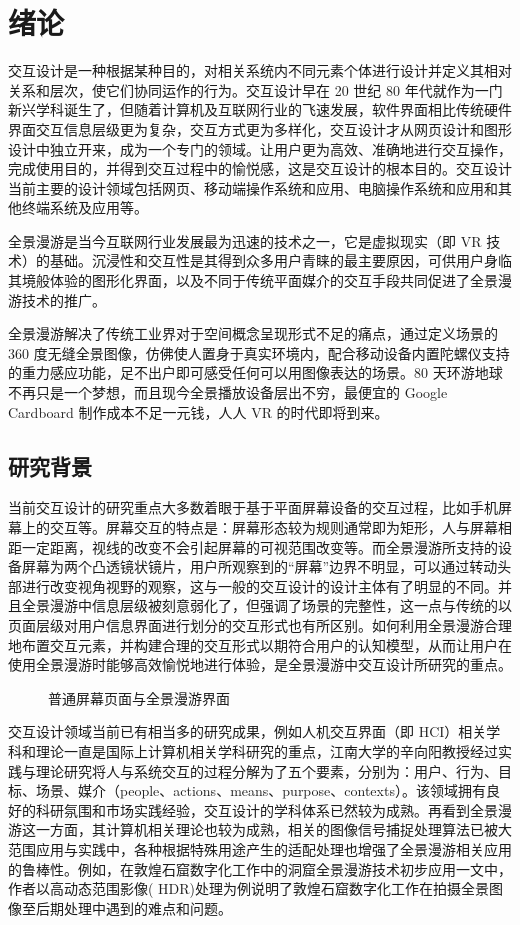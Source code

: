 \chapter{绪论}

交互设计是一种根据某种目的，对相关系统内不同元素个体进行设计并定义其相对关系和层次，使它们协同运作的行为。交互设计早在 20 世纪 80 年代就作为一门新兴学科诞生了，但随着计算机及互联网行业的飞速发展，软件界面相比传统硬件界面交互信息层级更为复杂，交互方式更为多样化，交互设计才从网页设计和图形设计中独立开来，成为一个专门的领域。让用户更为高效、准确地进行交互操作，完成使用目的，并得到交互过程中的愉悦感，这是交互设计的根本目的。交互设计当前主要的设计领域包括网页、移动端操作系统和应用、电脑操作系统和应用和其他终端系统及应用等。

全景漫游是当今互联网行业发展最为迅速的技术之一，它是虚拟现实（即 VR 技术）的基础。沉浸性和交互性是其得到众多用户青睐的最主要原因，可供用户身临其境般体验的图形化界面，以及不同于传统平面媒介的交互手段共同促进了全景漫游技术的推广。

全景漫游解决了传统工业界对于空间概念呈现形式不足的痛点，通过定义场景的 360 度无缝全景图像，仿佛使人置身于真实环境内，配合移动设备内置陀螺仪支持的重力感应功能，足不出户即可感受任何可以用图像表达的场景。80 天环游地球不再只是一个梦想，而且现今全景播放设备层出不穷，最便宜的 Google Cardboard 制作成本不足一元钱，人人 VR 的时代即将到来。

\section{研究背景}
当前交互设计的研究重点大多数着眼于基于平面屏幕设备的交互过程，比如手机屏幕上的交互等。屏幕交互的特点是：屏幕形态较为规则通常即为矩形，人与屏幕相距一定距离，视线的改变不会引起屏幕的可视范围改变等。而全景漫游所支持的设备屏幕为两个凸透镜状镜片，用户所观察到的“屏幕”边界不明显，可以通过转动头部进行改变视角视野的观察，这与一般的交互设计的设计主体有了明显的不同。并且全景漫游中信息层级被刻意弱化了，但强调了场景的完整性，这一点与传统的以页面层级对用户信息界面进行划分的交互形式也有所区别。如何利用全景漫游合理地布置交互元素，并构建合理的交互形式以期符合用户的认知模型，从而让用户在使用全景漫游时能够高效愉悦地进行体验，是全景漫游中交互设计所研究的重点。

\begin{figure}[htp]
\centering
{}
\caption{普通屏幕页面与全景漫游界面}
\label{fig:screen}
\end{figure}

交互设计领域当前已有相当多的研究成果，例如人机交互界面（即 HCI）相关学科和理论一直是国际上计算机相关学科研究的重点，江南大学的辛向阳教授经过实践与理论研究将人与系统交互的过程分解为了五个要素，分别为：用户、行为、目标、场景、媒介（people、actions、means、purpose、contexts）。该领域拥有良好的科研氛围和市场实践经验，交互设计的学科体系已然较为成熟。再看到全景漫游这一方面，其计算机相关理论也较为成熟，相关的图像信号捕捉处理算法已被大范围应用与实践中，各种根据特殊用途产生的适配处理也增强了全景漫游相关应用的鲁棒性。例如，在敦煌石窟数字化工作中的洞窟全景漫游技术初步应用一文中，作者以高动态范围影像( HDR)处理为例说明了敦煌石窟数字化工作在拍摄全景图像至后期处理中遇到的难点和问题。

